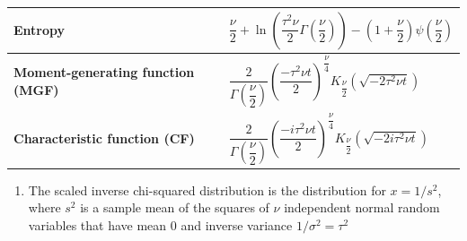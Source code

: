 \begin{longtable}{|m{6cm}|p{9cm}|}
    \textbf{Entropy} &
    ${\displaystyle {\dfrac {\nu }{2}}\!+\!\ln \left({\dfrac {\tau ^{2}\nu }{2}}\Gamma \left({\dfrac {\nu }{2}}\right)\right)}{\displaystyle \!-\!\left(1\!+\!{\dfrac {\nu }{2}}\right)\psi \left({\dfrac {\nu }{2}}\right)}$
    \\[1ex] \hline

    \textbf{Moment-generating function (MGF)} &
    ${\displaystyle {\dfrac {2}{\Gamma ({\dfrac {\nu }{2}})}}\left({\dfrac {-\tau ^{2}\nu t}{2}}\right)^{\!\!{\dfrac {\nu }{4}}}\!\!K_{\dfrac {\nu }{2}}\left({\sqrt {-2\tau ^{2}\nu t}}\right)}$
    \\[1ex] \hline

    \textbf{Characteristic function (CF)} &
    ${\displaystyle {\dfrac {2}{\Gamma ({\dfrac {\nu }{2}})}}\left({\dfrac {-i\tau ^{2}\nu t}{2}}\right)^{\!\!{\dfrac {\nu }{4}}}\!\!K_{\dfrac {\nu }{2}}\left({\sqrt {-2i\tau ^{2}\nu t}}\right)}$
    \\[1ex] \hline

\end{longtable}
\renewcommand{\arraystretch}{1}

\begin{enumerate}
    \item The scaled inverse chi-squared distribution is the distribution for $x = 1/s^2$, where $s^2$ is a sample mean of the squares of $\nu$ independent normal random variables that have mean $0$ and inverse variance $1/\sigma^2 = \tau^2$

\end{enumerate}























































